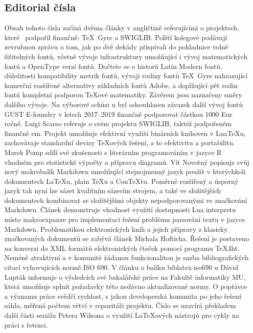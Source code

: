 \subsection*{Editorial čísla}
Obsah tohoto čísla začíná dvěma články v angličtině referujícími o projektech, které \CSTUG\ podpořil finančně: \TeX\ Gyre a SWIGLIB.
Polští kolegové podávají zevrubnou zprávu o tom, jak po dvě dekády přispívali do pokladnice volně šiřitelných fontů, včetně vývoje infrastruktury umožňující i vývoj matematických fontů a OpenType verzí fontů. Dočtete se o historii Latin Modern fontů, důležitosti kompatibility metrik fontů, vývoji rodiny fontů \TeX\ Gyre nahrazující komerční rozšířené alternativy základních fontů Adobe, a doplňující pět rodin fontů kompletní podporou \TeX ové matematiky. Závěrem jsou naznačeny směry dalšího vývoje.
Na výborové schůzi \CSTUG u byl odsouhlasen závazek další vývoj fontů GUST E-foundry v letech 2017--2019 finančně podporovat částkou 1000 Eur ročně.
Luigi Scarso referuje o svém projektu SWIGLIB, taktéž podpořeném finančně \CSTUG em. Projekt umožňuje efektivní využití binárních knihoven v Lua\TeX u, zachovávaje standardní devizy \TeX ových řešení, a to efektivitu a portabilitu.
Marek Pomp sdílí své zkušenosti s literárním programováním v jazyce R vhodném pro statistické výpočty a přípravu diagramů.
Vít Novotný popisuje svůj nový makrobalík Markdown umožňující stejnojmenný jazyk použít v kterýchkoli dokumentech \LaTeX u, plain \TeX u a Con\TeX tu. Poměrně rozšířený a úsporný jazyk tak nyní lze sázet kvalitním sázecím strojem, a také ve složitějších dokumentech kombinovat se složitějšími objekty nepodporovanými ve značkování Markdown. Článek demonstruje vhodnost využití dostupnosti Lua interpretu místo makroexpanze pro implementaci řešení  problému parsování textu v jazyce Markdown.
Problematikou elektronických knih a jejich přípravy z klasicky značkovaných dokumentů se zabývá článek Michala Hofticha.  Řešení je postaveno na konverzi do XML formátů elektronických čteček pomocí programu \TeX4ht.
Neméně atraktivní a v komunitě žádanou funkcionalitou je sazba bibliografických citací vyhovujících normě ISO 690.  V článku o balíku \textsf{biblatex-iso690} \biblatex u Dávid Lupták informuje o výsledcích své bakalářské práce na Fakultě informatiky MU, která umožňuje splnit požadavky této nedávno aktualizované normy.  O poptávce a významu práce svědčí rychlost, s jakou  developerská komunita po jeho řešení sáhla, měřená počtem větví v repozitáři projektu. 
Číslo se uzavírá překladem další části seriálu Petera Wilsona o využití \LaTeX o\-vých nástrojů pro cykly na práci s řetezci.
